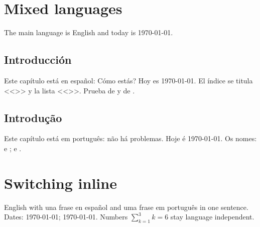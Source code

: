 \documentclass[11pt]{report}
\begin{document}
\tableofcontents
\listoftables
\chapter{Mixed languages}
The main language is English and today is \today.

\begin{otherlanguage}{spanish}
\chapter{Introducci\'on}
Este cap\'itulo est\'a en espa\~nol: \textquestiondown C\'omo est\'as? Hoy es \today.
El \'indice se titula <<\contentsname>> y la lista <<\listtablename>>.
Prueba de \chaptername{} y de \tablename.
\end{otherlanguage}

\begin{otherlanguage}{portuguese}
\chapter{Introdu\c{c}\~ao}
Este cap\'itulo est\'a em portugu\^es: n\~ao h\'a problemas. Hoje \'e \today.
Os nomes: \contentsname{} e \listtablename; \chaptername{} e \tablename.
\end{otherlanguage}

\chapter{Switching inline}
English with \foreignlanguage{spanish}{una frase en espa\~nol} and
\foreignlanguage{portuguese}{uma frase em portugu\^es} in one sentence.
Dates: \foreignlanguage{spanish}{\today}; \foreignlanguage{portuguese}{\today}.
Numbers $\sum_{k=1}^{3}k=6$ stay language independent.
\end{document}
